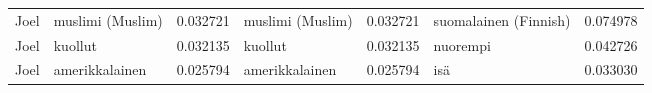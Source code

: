 \begin{tabular}{llrlrlr}
  Joel &      muslimi (Muslim) &                         0.032721 &       muslimi (Muslim) &                              0.032721 & suomalainen (Finnish) &                        0.074978 \\
  Joel &               kuollut &                         0.032135 &                kuollut &                              0.032135 &              nuorempi &                        0.042726 \\
  Joel &        amerikkalainen &                         0.025794 &         amerikkalainen &                              0.025794 &                   isä &                        0.033030 \\
\bottomrule
\end{tabular}
